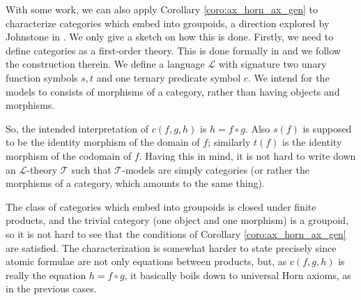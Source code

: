 \begin{eg}
	With some work, we can also apply Corollary \ref{coro:ax_horn_ax_gen} to characterize categories which embed into groupoids, a direction explored by Johnstone in \cite{johnstone2008embedding}. We only give a sketch on how this is done. Firstly, we need to define categories as a first-order theory. This is done formally in \cite[Section 3]{nlab:fully_formal_etcs} and we follow the construction therein. We define a language $\mathcal{L}$ with signature two unary function symbols $s,t$ and one ternary predicate symbol $c$. We intend for the models to consists of morphisms of a category, rather than having objects and morphisms. 
	
	So, the intended interpretation of $c(f,g,h)$ is $h = f\circ g$. Also $s(f)$ is supposed to be the identity morphism of the domain of $f$; similarly $t(f)$ is the identity morphism of the codomain of $f$. Having this in mind, it is not hard to write down an $\mathcal{L}$-theory $\mathcal{T}$ such that $\mathcal{T}$-models are simply categories (or rather the morphisms of a category, which amounts to the same thing).
	
	The class of categories which embed into groupoids is closed under finite products, and the trivial category (one object and one morphism) is a groupoid, so it is not hard to see that the conditions of Corollary \ref{coro:ax_horn_ax_gen} are satisfied. The characterization is somewhat harder to state precisely since atomic formulae are not only equations between products, but, as $c(f,g,h)$ is really the equation $h = f\circ g$, it basically boils down to universal Horn axioms, as in the previous cases.
\end{eg}